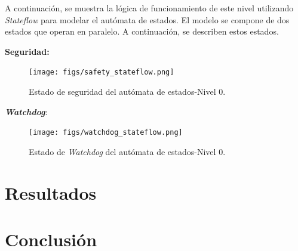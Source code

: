 \documentclass{article}
\begin{document}
            A continuación, se muestra la lógica de funcionamiento de este nivel utilizando \textit{Stateflow} para modelar el autómata de estados. El modelo se compone de dos estados que operan en paralelo. A continuación, se describen estos estados.

            \textbf{Seguridad:}
            \begin{figure}
                \centering
                \texttt{[image: figs/safety\_stateflow.png]}
                \caption{Estado de seguridad del autómata de estados-Nivel 0.}
                \label{fig:safety_stateflow}
            \end{figure}

            \textbf{\textit{Watchdog}}:
            \begin{figure}
                \centering
                \texttt{[image: figs/watchdog\_stateflow.png]}
                \caption{Estado de \textit{Watchdog} del autómata de estados-Nivel 0.}
                \label{fig:watchdog_stateflow}
            \end{figure}




\section{Resultados}\label{sec:results}

\section{Conclusión}\label{sec:conclusion}


%

%
\end{document}
